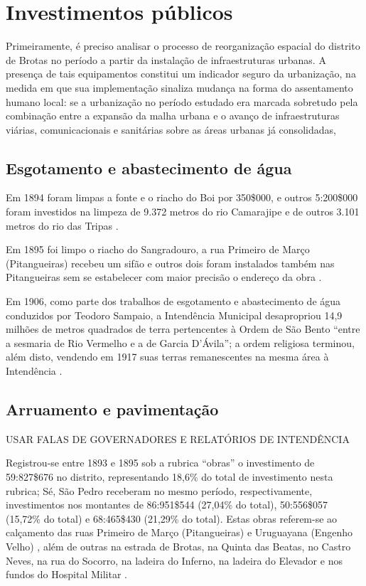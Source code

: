 \section{Investimentos públicos}\label{sec:3.1}

Primeiramente, é preciso analisar o processo de reorganização espacial do distrito de Brotas no período a partir da instalação de infraestruturas urbanas. A presença de tais equipamentos constitui um indicador seguro da urbanização, na medida em que sua implementação sinaliza mudança na forma do assentamento humano local: se a urbanização no período estudado era marcada sobretudo pela combinação entre a expansão da malha urbana e o avanço de infraestruturas viárias, comunicacionais e sanitárias sobre as áreas urbanas já consolidadas, 

\subsection{Esgotamento e abastecimento de água}

Em 1894 foram limpas a fonte e o riacho do Boi por 350\$000, e outros 5:200\$000 foram investidos na limpeza de 9.372 metros do rio Camarajipe e de outros 3.101 metros do rio das Tripas \cite[p.~156]{salvador_relatorio_1894}.

Em 1895 foi limpo o riacho do Sangradouro, a rua Primeiro de Março (Pitangueiras) recebeu um sifão e outros dois foram instalados também nas Pitangueiras sem se estabelecer com maior precisão o endereço da obra \cite[pp.~20, 137-138]{salvador_relatorio_1896}. 


Em 1906, como parte dos trabalhos de esgotamento e abastecimento de água conduzidos por Teodoro Sampaio, a Intendência Municipal desapropriou 14,9 milhões de metros quadrados de terra pertencentes à Ordem de São Bento ``entre a sesmaria de Rio Vermelho e a de Garcia D'Ávila''; a ordem religiosa terminou, além disto, vendendo em 1917 suas terras remanescentes na mesma área à Intendência \cite[p.~306]{VASCONCELOS2002}.


\subsection{Arruamento e pavimentação}

USAR FALAS DE GOVERNADORES E RELATÓRIOS DE INTENDÊNCIA

Registrou-se entre 1893 e 1895 sob a rubrica ``obras'' o investimento de 59:827\$676 no distrito, representando 18,6\% do total de investimento nesta rubrica; Sé, São Pedro receberam no mesmo período, respectivamente, investimentos nos montantes de 86:951\$544 (27,04\% do total), 50:556\$057 (15,72\% do total) e 68:465\$430 (21,29\% do total). Estas obras referem-se ao calçamento das ruas Primeiro de Março (Pitangueiras) e Uruguayana (Engenho Velho) \cite[pp.~21-23, 138]{salvador_relatorio_1896}, além de outras na estrada de Brotas, na Quinta das Beatas, no Castro Neves, na rua do Socorro, na ladeira do Inferno, na ladeira do Elevador e nos fundos do Hospital Militar \cite[p.~157]{salvador_relatorio_1894}.

